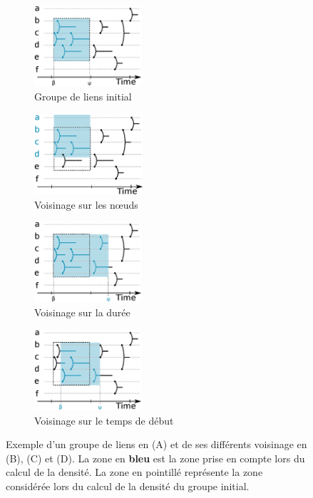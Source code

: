 \begin{figure}
\centering
	\begin{subfigure}{0.3\textwidth}
		\includegraphics[height=3cm]{img/GroupeDense/GroupExample/Voisinage/Base.eps}
		\caption{Groupe de liens initial}
	\end{subfigure}\hspace*{0.05cm}

	\begin{subfigure}{0.3\textwidth}
		\includegraphics[height=3cm]{img/GroupeDense/GroupExample/Voisinage/Variable_Nodes.eps}
		\caption{Voisinage sur les n\oe uds}
	\end{subfigure}\hspace*{0.05cm}
	\begin{subfigure}{0.3\textwidth}
		\includegraphics[height=3cm]{img/GroupeDense/GroupExample/Voisinage/Variable_duration.eps}
		\caption{Voisinage sur la durée}
	\end{subfigure}\hspace*{0.05cm}
	\begin{subfigure}{0.3\textwidth}
		\includegraphics[height=3cm]{img/GroupeDense/GroupExample/Voisinage/Variable_start.eps}
		\caption{Voisinage sur le temps de début}
	\end{subfigure}	
	\caption{Exemple d'un groupe de liens en (A) et de ses différents voisinage en (B), (C) et (D).
	La zone en \textcolor{bleu_transparent}{\textbf{bleu}} est la zone prise en compte lors du calcul de la densité.
	La zone en pointillé représente la zone considérée lors du calcul de la densité du groupe initial.
	}
	\label{fig:voisinage_groupe}
\end{figure}


